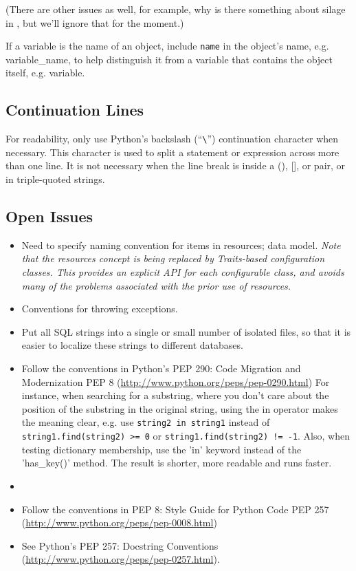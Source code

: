 (There are other issues as well, for example, why is there something about
silage in , but we'll ignore that for the moment.)

If a variable is the name of an object, include \verb|name| in the object's
name, e.g. variable_name, to help distinguish it from a variable that contains
the object itself, e.g. variable.

\subsection{Continuation Lines}

For readability, only use Python's backslash (``\verb|\|'') continuation
character when necessary.  This character is used to split a statement or
expression across more than one line.  It is not necessary when the line
break is inside a (), [], or {} pair, or in triple-quoted strings.

\subsection{Open Issues}

\begin{itemize}

\item Need to specify naming convention for items in resources; data model.
\emph{Note that the resources concept is being replaced by
Traits-based configuration classes.  This provides an explicit API
for each configurable class, and avoids many of the problems
associated with the prior use of resources.}

\item Conventions for throwing exceptions.

\item Put all SQL strings into a single or small number of
isolated files, so that it is easier to localize these strings to different
databases.

\item Follow the conventions in Python's \pythonindex PEP 290: Code
Migration and Modernization PEP 8
(\url{http://www.python.org/peps/pep-0290.html}) For instance, when
searching for a substring, where you don't care about the position of the
substring in the original string, using the in operator makes the meaning
clear, e.g. use \verb|string2 in string1| instead of
\verb|string1.find(string2) >= 0| or \verb|string1.find(string2) != -1|.  Also,
when testing dictionary membership, use the 'in' keyword instead of the
'has_key()' method. The result is shorter, more readable and runs faster.\item

\item Follow the conventions in PEP 8: Style Guide for Python \pythonindex Code
PEP 257 (\url{http://www.python.org/peps/pep-0008.html})

\item See Python's \pythonindex PEP 257: Docstring Conventions
(\url{http://www.python.org/peps/pep-0257.html}).

\end{itemize}

